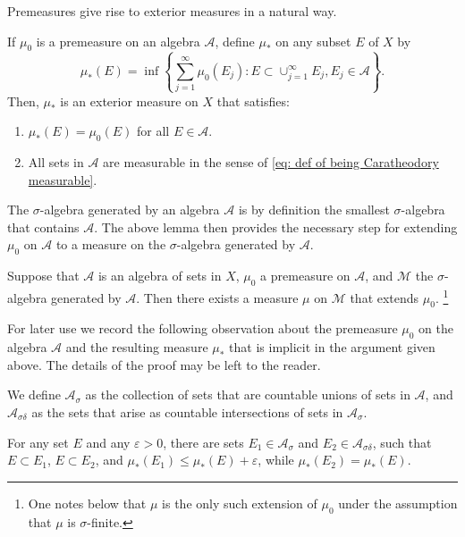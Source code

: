 Premeasures give rise to exterior measures in a natural way.

\begin{lemma}
  If $\mu_0$ is a premeasure on an algebra $\mathcal A$, define $\mu_*$ on any subset $E$ of $X$ by 
  \[
  \mu_*(E) = \inf\left\{\sum_{j=1}^\infty \mu_0(E_j): E\subset\cup_{j=1}^\infty E_j, E_j\in\mathcal A \right\}.
  \]
  Then, $\mu_*$ is an exterior measure on $X$ that satisfies:
  \begin{enumerate}
    \item $\mu_*(E) = \mu_0(E)$ for all $E\in\mathcal A$.
    \item All sets in $\mathcal A$ are measurable in the sense of \eqref{eq: def of being Caratheodory measurable}.
  \end{enumerate}
\end{lemma}

The $\sigma$-algebra generated by an algebra $\mathcal A$ is by definition the smallest $\sigma$-algebra that contains $\mathcal A$.
The above lemma then provides the necessary step for extending $\mu_0$ on $\mathcal A$ to a measure on the $\sigma$-algebra generated by $\mathcal A$.

\begin{theorem}
  Suppose that $\mathcal A$ is an algebra of sets in $X$, 
  $\mu_0$ a premeasure on $\mathcal A$, 
  and $\mathcal M$ the $\sigma$-algebra generated by $\mathcal A$.
  Then there exists a measure $\mu$ on $\mathcal M$ that extends $\mu_0$.
  \footnote{One notes below that $\mu$ is the only such extension of $\mu_0$ under the assumption that $\mu$ is $\sigma$-finite.}
\end{theorem}

For later use we record the following observation about the premeasure $\mu_0$ on the algebra $\mathcal A$ 
and the resulting measure $\mu_*$ that is implicit in the argument given above. 
The details of the proof may be left to the reader.

We define $\mathcal A_\sigma$ as the collection of sets that are countable unions of sets in $\mathcal A$,
and $\mathcal A_{\sigma\delta}$ as the sets that arise as countable intersections of sets in $\mathcal A_\sigma$.

\begin{proposition}
  For any set $E$ and any $\varepsilon>0$, there are sets $E_1\in\mathcal A_\sigma$ and $E_2\in\mathcal A_{\sigma\delta}$,
  such that $E\subset E_1$, $E\subset E_2$, and $\mu_*(E_1)\leq \mu_*(E) + \varepsilon$,
  while $\mu_*(E_2) = \mu_*(E)$.
\end{proposition}

